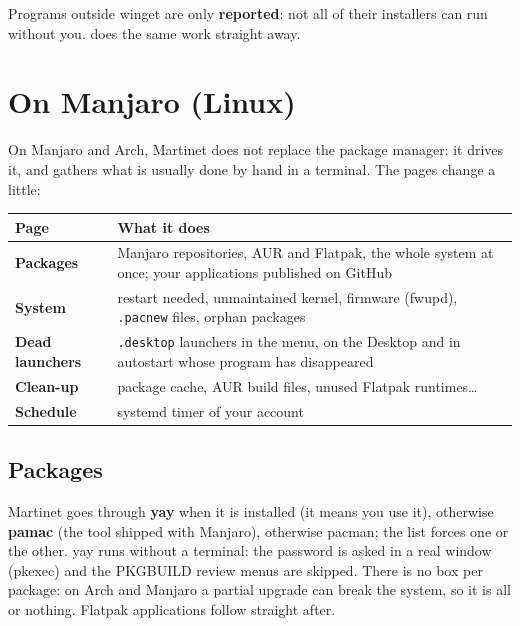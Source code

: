 Programs outside winget are only \textbf{reported}: not all of their installers can run without you.
 does the same work straight away.

\section{On Manjaro (Linux)}\label{sec:linux}


On Manjaro and Arch, Martinet does not replace the package manager: it drives it, and gathers what is
usually done by hand in a terminal. The pages change a little:

\begin{center}
\renewcommand{\arraystretch}{1.35}
\begin{tabularx}{\linewidth}{>{\sffamily\bfseries\color{bordeaux}}l >{\raggedright\arraybackslash}X}
\toprule
\textbf{\color{ink}Page} & \textbf{What it does} \\
\midrule
Packages & Manjaro repositories, AUR and Flatpak, the whole system at once; your applications published on GitHub \\
System & restart needed, unmaintained kernel, firmware (fwupd), \texttt{.pacnew} files, orphan packages \\
Dead launchers & \texttt{.desktop} launchers in the menu, on the Desktop and in autostart whose program has disappeared \\
Clean-up & package cache, AUR build files, unused Flatpak runtimes… \\
Schedule & systemd timer of your account \\
\bottomrule
\end{tabularx}
\end{center}

\subsection{Packages}


Martinet goes through \textbf{yay} when it is installed (it means you use it), otherwise
\textbf{pamac} (the tool shipped with Manjaro), otherwise pacman; the  list
forces one or the other. yay runs without a terminal: the password is asked in a real window
(pkexec) and the PKGBUILD review menus are skipped. There is no box per package: on Arch and Manjaro a
partial upgrade can break the system, so it is all or nothing. Flatpak applications follow straight
after.

